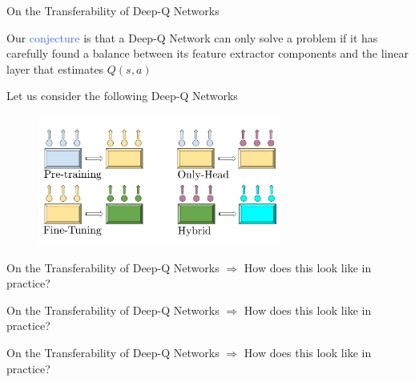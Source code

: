 \documentclass{beamer}
\begin{document}
\begin{frame}{On the Transferability of Deep-Q Networks}

	\bigskip
	Our \textcolor{RoyalBlue}{conjecture} is that a Deep-Q Network can only solve a problem if it has carefully found a balance between its feature extractor components and the linear layer that estimates $Q(s,a)$

	\bigskip

	Let us consider the following Deep-Q Networks

	\begin{figure}[ht]
		\centering
		\includegraphics[width=8cm]{./figures/new_networks_2.pdf}
	\end{figure}

\end{frame}


\begin{frame}{On the Transferability of Deep-Q Networks}
	\bigskip
	$\Rightarrow$ How does this look like in practice?
	\bigskip
	

\end{frame}

\begin{frame}{On the Transferability of Deep-Q Networks}
	\bigskip
	$\Rightarrow$ How does this look like in practice?
	\bigskip
	

\end{frame}

\begin{frame}{On the Transferability of Deep-Q Networks}
	\bigskip
	$\Rightarrow$ How does this look like in practice?
	\bigskip
	

\end{frame}
\end{document}
